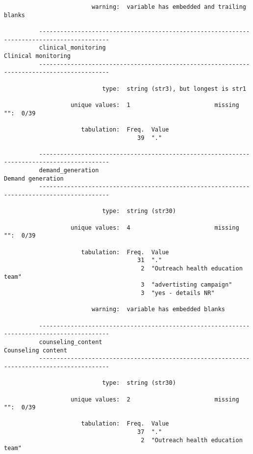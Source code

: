 \documentclass{article}
\begin{document}
\begin{verbatim}
                         warning:  variable has embedded and trailing blanks
          
          ------------------------------------------------------------------------------------------
          clinical_monitoring                                                    Clinical monitoring
          ------------------------------------------------------------------------------------------
          
                            type:  string (str3), but longest is str1
          
                   unique values:  1                        missing "":  0/39
          
                      tabulation:  Freq.  Value
                                      39  "."
          
          ------------------------------------------------------------------------------------------
          demand_generation                                                        Demand generation
          ------------------------------------------------------------------------------------------
          
                            type:  string (str30)
          
                   unique values:  4                        missing "":  0/39
          
                      tabulation:  Freq.  Value
                                      31  "."
                                       2  "Outreach health education team"
                                       3  "advertisting campaign"
                                       3  "yes - details NR"
          
                         warning:  variable has embedded blanks
          
          ------------------------------------------------------------------------------------------
          counseling_content                                                      Counseling content
          ------------------------------------------------------------------------------------------
          
                            type:  string (str30)
          
                   unique values:  2                        missing "":  0/39
          
                      tabulation:  Freq.  Value
                                      37  "."
                                       2  "Outreach health education team"
          

\end{verbatim}
\end{document}
